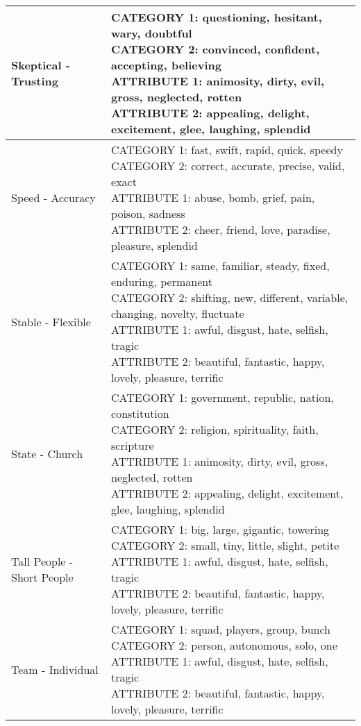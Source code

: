 \documentclass[]{article}
\begin{document}
\begin{table}[H]
\begin{tabular}{l|l}
\hline
Skeptical - Trusting & \makecell[l]{CATEGORY 1:  questioning, hesitant, wary, doubtful \\ CATEGORY 2:  convinced, confident, accepting, believing \\ ATTRIBUTE 1:  animosity, dirty, evil, gross, neglected, rotten \\ ATTRIBUTE 2:  appealing, delight, excitement, glee, laughing, splendid \\}\\
\hline
Speed - Accuracy & \makecell[l]{CATEGORY 1:  fast, swift, rapid, quick, speedy \\ CATEGORY 2:  correct, accurate, precise, valid, exact \\ ATTRIBUTE 1:  abuse, bomb, grief, pain, poison, sadness \\ ATTRIBUTE 2:  cheer, friend, love, paradise, pleasure, splendid \\}\\
\hline
Stable - Flexible & \makecell[l]{CATEGORY 1:  same, familiar, steady, fixed, enduring, permanent \\ CATEGORY 2:  shifting, new, different, variable, changing, novelty, fluctuate \\ ATTRIBUTE 1:  awful, disgust, hate, selfish, tragic \\ ATTRIBUTE 2:  beautiful, fantastic, happy, lovely, pleasure, terrific \\}\\
\hline
State - Church & \makecell[l]{CATEGORY 1:  government, republic, nation, constitution \\ CATEGORY 2:  religion, spirituality, faith, scripture \\ ATTRIBUTE 1:  animosity, dirty, evil, gross, neglected, rotten \\ ATTRIBUTE 2:  appealing, delight, excitement, glee, laughing, splendid \\}\\
\hline
Tall People - Short People & \makecell[l]{CATEGORY 1:  big, large, gigantic, towering \\ CATEGORY 2:  small, tiny, little, slight, petite \\ ATTRIBUTE 1:  awful, disgust, hate, selfish, tragic \\ ATTRIBUTE 2:  beautiful, fantastic, happy, lovely, pleasure, terrific \\}\\
\hline
Team - Individual & \makecell[l]{CATEGORY 1:  squad, players, group, bunch \\ CATEGORY 2:  person, autonomous, solo, one \\ ATTRIBUTE 1:  awful, disgust, hate, selfish, tragic \\ ATTRIBUTE 2:  beautiful, fantastic, happy, lovely, pleasure, terrific \\}\\

\end{tabular}
\end{table}
\end{document}
